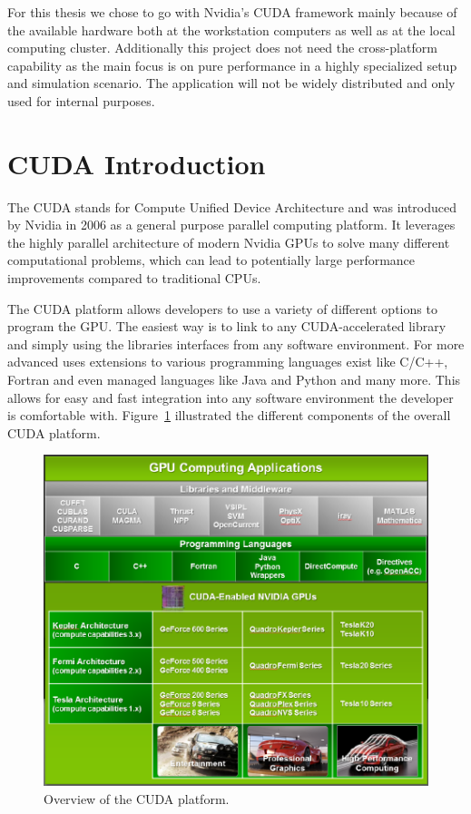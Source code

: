 \documentclass[a4paper,11pt]{kth-mag}
\begin{document}
For this thesis we chose to go with Nvidia's CUDA framework mainly because of the available hardware both at the workstation computers as well as at the local computing cluster. Additionally this project does not need the cross-platform capability as the main focus is on pure performance in a highly specialized setup and simulation scenario. The application will not be widely distributed and only used for internal purposes.

\section{CUDA Introduction}
\label{sec:CUDA}
The CUDA stands for Compute Unified Device Architecture and was introduced by Nvidia in 2006 as a general purpose parallel computing platform. It leverages the highly parallel architecture of modern Nvidia GPUs to solve many different computational problems, which can lead to potentially large performance improvements compared to traditional CPUs.

The CUDA platform allows developers to use a variety of different options to program the GPU. The easiest way is to link to any CUDA-accelerated library and simply using the libraries interfaces from any software environment. For more advanced uses extensions to various programming languages exist like C/C++, Fortran and even managed languages like Java and Python and many more. This allows for easy and fast integration into any software environment the developer is comfortable with. Figure~\ref{fig:cuda_overview} illustrated the different components of the overall CUDA platform.

\begin{figure}[!htbp]
  \centering
  \includegraphics[width=\textwidth]{img/cuda_overview.pdf}
  \caption{Overview of the CUDA platform.}
  \label{fig:cuda_overview}
\end{figure}
\end{document}
